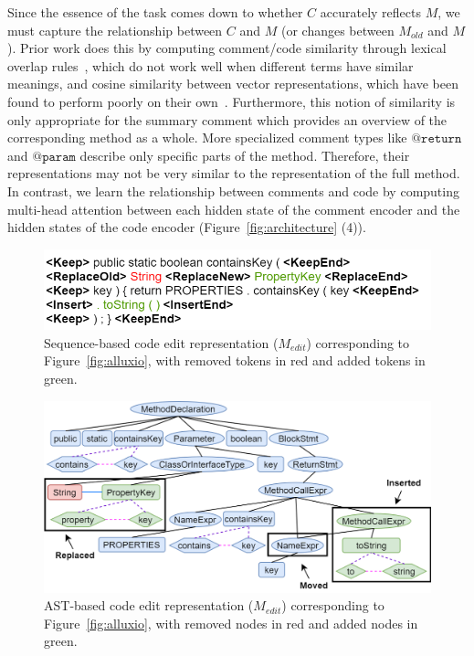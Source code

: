 \documentclass[letterpaper]{article} %
\makeatletter
\newcommand{\CodeIn}[1]{{\ifmmode{\mathtt{#1}}\else$\mathtt{#1}$\fi}}
\newcommand{\Return}{\CodeIn{@return}}
\newcommand{\Param}{\CodeIn{@param}}
\newcommand{\Comment}{$C$}
\newcommand{\OldCode}{$M_{old}$}
\newcommand{\NewCode}{$M$}
\newcommand{\EditCode}{$M_{edit}$}
\makeatother
\begin{document}
Since the essence of the task comes down to whether \Comment{} accurately reflects \NewCode{}, we must capture the relationship between \Comment{} and \NewCode{} (or changes between \OldCode{} and \NewCode{}). Prior work does this by computing comment/code similarity through lexical overlap rules~\cite{ratol2017fragile,SaduThesis}, which do not work well when different terms have similar meanings, and cosine similarity between vector representations, which have been found to perform poorly on their own~\cite{LiuOutdatedLine,Cimasa19}. Furthermore, this notion of similarity is only appropriate for the summary comment which provides an overview of the corresponding method as a whole. More specialized comment types like \Return{} and \Param{} describe only specific parts of the method. Therefore, their representations may not be very similar to the representation of the full method. In contrast, we learn the relationship between comments and code by computing multi-head attention between each hidden state of the comment encoder and the hidden states of the code encoder (Figure~\ref{fig:architecture} (4)).


\begin{figure}
\centering
\includegraphics[width=\columnwidth]{images/diff_sequence.png}
\vspace{-5pt}
\caption{Sequence-based code edit representation (\EditCode{}) corresponding to Figure~\ref{fig:alluxio}, with removed tokens in red and added tokens in green.}
\label{fig:diff_sequence}
\end{figure}


\begin{figure}
\centering
\includegraphics[width=\columnwidth]{images/diff_ast.png}
\vspace{-5pt}
\caption{AST-based code edit representation (\EditCode{}) corresponding to Figure~\ref{fig:alluxio}, with removed nodes in red and added nodes in green.}
\label{fig:diff_ast}
\vspace{-10pt}
\end{figure}
\end{document}
